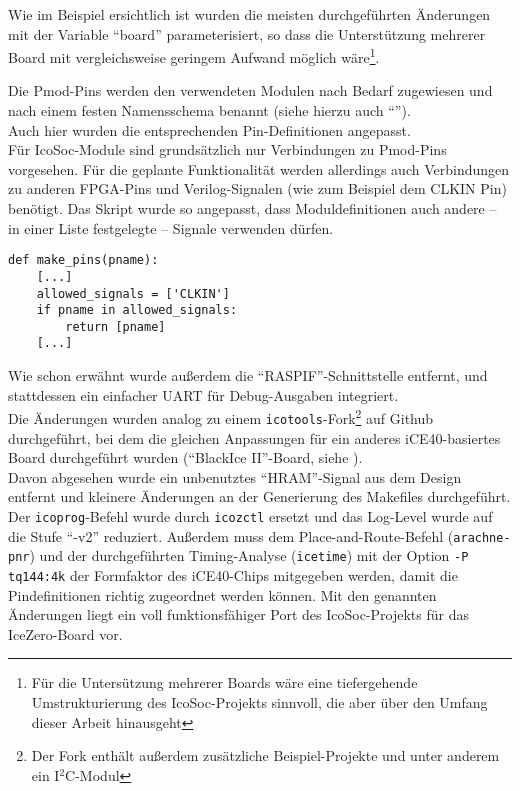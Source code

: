 {Wie im Beispiel ersichtlich ist wurden die meisten durchgeführten Änderungen mit der Variable ``board''  parameterisiert, so dass die Unterstützung mehrerer Board mit vergleichsweise geringem Aufwand möglich wäre\footnote{Für die Untersützung mehrerer Boards wäre eine tiefergehende Umstrukturierung des IcoSoc-Projekts sinnvoll, die aber über den Umfang dieser Arbeit hinausgeht}.

Die Pmod-Pins werden den verwendeten Modulen nach Bedarf zugewiesen und nach einem festen Namensschema benannt (siehe hierzu auch ``'').\\
Auch hier wurden die entsprechenden Pin-Definitionen angepasst.\\
Für IcoSoc-Module sind grundsätzlich nur Verbindungen zu Pmod-Pins vorgesehen. Für die geplante Funktionalität werden allerdings auch Verbindungen zu anderen FPGA-Pins und Verilog-Signalen (wie zum Beispiel dem CLKIN Pin) benötigt. Das Skript wurde so angepasst, dass Moduldefinitionen auch andere -- in einer Liste festgelegte --  Signale verwenden dürfen.
\begin{verbatim}
def make_pins(pname):
    [...]
    allowed_signals = ['CLKIN']
    if pname in allowed_signals:
        return [pname]
    [...]
\end{verbatim} 

Wie schon erwähnt wurde außerdem die ``RASPIF''-Schnittstelle entfernt, und stattdessen ein einfacher UART für Debug-Ausgaben integriert.\\
Die Änderungen wurden analog zu einem {\tt icotools}-Fork\footnote{Der Fork enthält außerdem zusätzliche Beispiel-Projekte und unter anderem ein I$^2$C-Modul} auf Github durchgeführt, bei dem die gleichen Anpassungen für ein anderes iCE40-basiertes Board durchgeführt wurden (``BlackIce II''-Board, siehe \cite{web:lawrie_fork}). \\
Davon abgesehen wurde ein unbenutztes ``HRAM''-Signal aus dem Design entfernt und kleinere Änderungen an der Generierung des Makefiles durchgeführt. Der {\tt icoprog}-Befehl wurde durch {\tt icozctl} ersetzt und das Log-Level wurde auf die Stufe ``-v2'' reduziert. Außerdem muss dem Place-and-Route-Befehl ({\tt arachne-pnr}) und der durchgeführten Timing-Analyse ({\tt icetime}) mit der Option {\tt -P tq144:4k} der Formfaktor des iCE40-Chips mitgegeben werden, damit die Pindefinitionen richtig zugeordnet werden können.   
Mit den genannten Änderungen liegt ein voll funktionsfähiger Port des IcoSoc-Projekts für das IceZero-Board vor.

}
